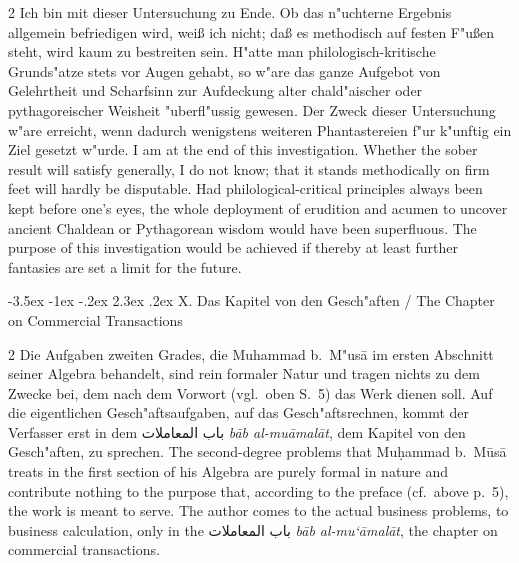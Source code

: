 \documentclass[10pt,a4paper]{article}
\makeatletter
\renewcommand{\switchcolumn}{\syncronize\nointerlineskip\columnbreak}
\newcommand{\RL}[1]{\beginR#1\endR}
\newcommand{\ar}[1]{{\arabicfont\RL{#1}}}
\renewcommand{\section}{\@startsection{section}{1}{\z@}%
  {-3.5ex \@plus -1ex \@minus -.2ex}%
  {2.3ex \@plus .2ex}%
  {\normalfont\Large\bfseries\color{sectioncolor}}}
\makeatother
\begin{document}
\begin{paracol}{2}
Ich bin mit dieser Untersuchung zu Ende. Ob das n"uchterne Ergebnis allgemein befriedigen wird, wei\ss{} ich nicht; da\ss{} es methodisch auf festen F"u\ss{}en steht, wird kaum zu bestreiten sein. H"atte man philologisch-kritische Grunds"atze stets vor Augen gehabt, so w"are das ganze Aufgebot von Gelehrtheit und Scharfsinn zur Aufdeckung alter chald"aischer oder pythagoreischer Weisheit "uberfl"ussig gewesen. Der Zweck dieser Untersuchung w"are erreicht, wenn dadurch wenigstens weiteren Phantastereien f"ur k"unftig ein Ziel gesetzt w"urde.
\switchcolumn
I am at the end of this investigation. Whether the sober result will satisfy generally, I do not know; that it stands methodically on firm feet will hardly be disputable. Had philological-critical principles always been kept before one's eyes, the whole deployment of erudition and acumen to uncover ancient Chaldean or Pythagorean wisdom would have been superfluous. The purpose of this investigation would be achieved if thereby at least further fantasies are set a limit for the future.
\end{paracol}
\clearpage


\section{X. Das Kapitel von den Gesch"aften / The Chapter on Commercial Transactions}

\begin{paracol}{2}
Die Aufgaben zweiten Grades, die Muhammad b.\ M"us\=a im ersten Abschnitt seiner Algebra behandelt, sind rein formaler Natur und tragen nichts zu dem Zwecke bei, dem nach dem Vorwort (vgl.\ oben S.\ 5) das Werk dienen soll. Auf die eigentlichen Gesch"aftsaufgaben, auf das Gesch"aftsrechnen, kommt der Verfasser erst in dem \ar{باب المعاملات} \textit{b\=ab al-mu\=amal\=at}, dem Kapitel von den Gesch"aften, zu sprechen.
\switchcolumn
The second-degree problems that Mu\d{h}ammad b.\ M\=us\=a treats in the first section of his Algebra are purely formal in nature and contribute nothing to the purpose that, according to the preface (cf.\ above p.\ 5), the work is meant to serve. The author comes to the actual business problems, to business calculation, only in the \ar{باب المعاملات} \textit{b\=ab al-mu`\=amal\=at}, the chapter on commercial transactions.
\end{paracol}
\end{document}
